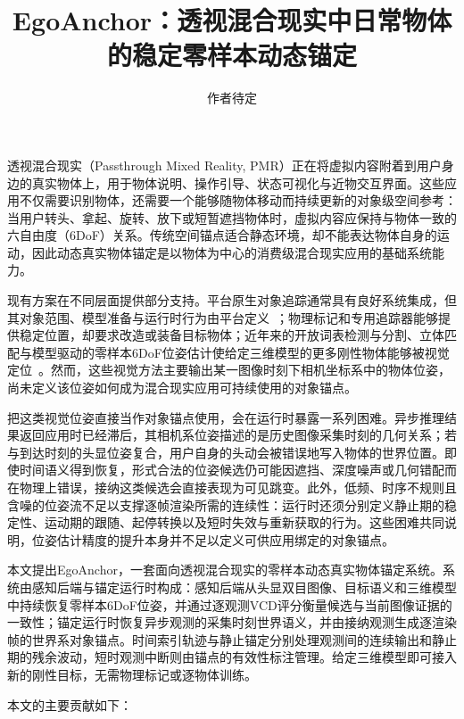 \documentclass[review]{vgtc}
\title{EgoAnchor：透视混合现实中日常物体的稳定零样本动态锚定}
\author{作者待定}
\begin{document}
\label{sec:introduction}
\maketitle

透视混合现实（Passthrough Mixed Reality, PMR）正在将虚拟内容附着到用户身边的真实物体上，用于物体说明、操作引导、状态可视化与近物交互界面。这些应用不仅需要识别物体，还需要一个能够随物体移动而持续更新的对象级空间参考：当用户转头、拿起、旋转、放下或短暂遮挡物体时，虚拟内容应保持与物体一致的六自由度（6DoF）关系。传统空间锚点适合静态环境，却不能表达物体自身的运动，因此动态真实物体锚定是以物体为中心的消费级混合现实应用的基础系统能力。

现有方案在不同层面提供部分支持。平台原生对象追踪通常具有良好系统集成，但其对象范围、模型准备与运行时行为由平台定义~\cite{appleObjectAnchor,appleObjectTracking2026,azureObjectAnchors,metaDynamicObjectTracker}；物理标记和专用追踪器能够提供稳定位置，却要求改造或装备目标物体；近年来的开放词表检测与分割、立体匹配与模型驱动的零样本6DoF位姿估计使给定三维模型的更多刚性物体能够被视觉定位~\cite{foundationpose2023,megapose2022}。然而，这些视觉方法主要输出某一图像时刻下相机坐标系中的物体位姿，尚未定义该位姿如何成为混合现实应用可持续使用的对象锚点。

把这类视觉位姿直接当作对象锚点使用，会在运行时暴露一系列困难。异步推理结果返回应用时已经滞后，其相机系位姿描述的是历史图像采集时刻的几何关系；若与到达时刻的头显位姿复合，用户自身的头动会被错误地写入物体的世界位置。即使时间语义得到恢复，形式合法的位姿候选仍可能因遮挡、深度噪声或几何错配而在物理上错误，接纳这类候选会直接表现为可见跳变。此外，低频、时序不规则且含噪的位姿流不足以支撑逐帧渲染所需的连续性：运行时还须分别定义静止期的稳定性、运动期的跟随、起停转换以及短时失效与重新获取的行为。这些困难共同说明，位姿估计精度的提升本身并不足以定义可供应用绑定的对象锚点。

本文提出EgoAnchor，一套面向透视混合现实的零样本动态真实物体锚定系统。系统由感知后端与锚定运行时构成：感知后端从头显双目图像、目标语义和三维模型中持续恢复零样本6DoF位姿，并通过逐观测VCD评分衡量候选与当前图像证据的一致性；锚定运行时恢复异步观测的采集时刻世界语义，并由接纳观测生成逐渲染帧的世界系对象锚点。时间索引轨迹与静止锚定分别处理观测间的连续输出和静止期的残余波动，短时观测中断则由锚点的有效性标注管理。给定三维模型即可接入新的刚性目标，无需物理标记或逐物体训练。

本文的主要贡献如下：
\end{document}

